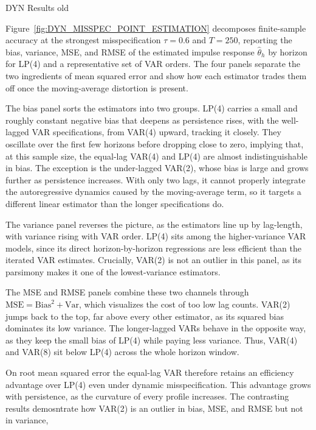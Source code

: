 DYN Results old

Figure~\ref{fig:DYN_MISSPEC_POINT_ESTIMATION} decomposes finite-sample accuracy at the strongest 
misspecification $\tau = 0.6$ and $T = 250$, reporting the bias, variance, MSE, and RMSE of the 
estimated impulse response $\hat\theta_h$ by horizon for LP(4) and a representative set of 
VAR orders. The four panels separate the two ingredients of mean squared error and show how 
each estimator trades them off once the moving-average distortion is present.

The bias panel sorts the estimators into two groups. LP(4) carries a small and roughly 
constant negative bias that deepens as persistence rises, with the well-lagged VAR specifications, 
from VAR(4) upward, tracking it closely. They oscillate over the first few horizons before dropping
close to zero, implying that, at this sample size, the equal-lag VAR(4) and LP(4) are almost 
indistinguishable in bias. The exception is the under-lagged VAR(2), whose bias is large 
and grows further as persistence increases. With only two lags, it cannot properly integrate the 
autoregressive dynamics caused by the moving-average term, so it targets a different 
linear estimator than the longer specifications do.

The variance panel reverses the picture, as the estimators line up by lag-length, 
with variance rising with VAR order. LP(4) sits among the higher-variance VAR
models, since its direct horizon-by-horizon regressions are less efficient 
than the iterated VAR estimates. Crucially, VAR(2) is not an outlier in this panel, as its 
parsimony makes it one of the lowest-variance estimators.

The MSE and RMSE panels combine these two channels through $\mathrm{MSE} = \mathrm{Bias}^2 + 
\mathrm{Var}$, which visualizes the cost of too low lag counts. VAR(2) jumps back to the top, 
far above every other estimator, as its squared bias dominates its low variance. 
The longer-lagged VARs behave in the opposite way, as they keep the small bias of LP(4) 
while paying less variance. Thus, VAR(4) and VAR(8) sit below LP(4) across 
the whole horizon window. 

On root mean squared error the equal-lag VAR therefore retains an efficiency advantage over 
LP(4) even under dynamic misspecification. This advantage grows with persistence, as the 
curvature of every profile increases. The contrasting results demosntrate how VAR(2) is an 
outlier in bias, MSE, and RMSE but not in variance, 

